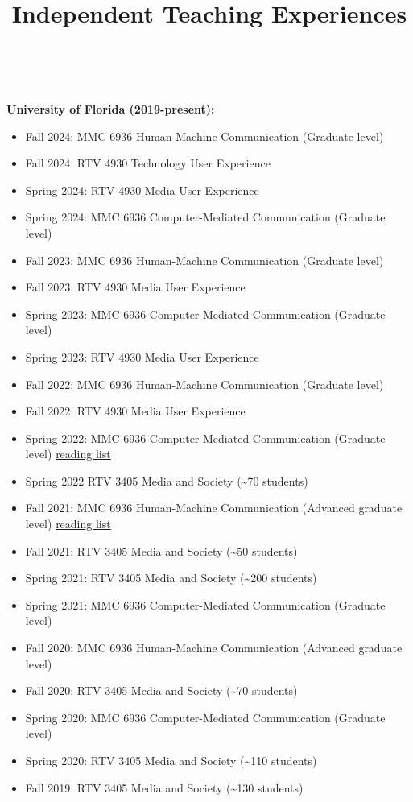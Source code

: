 \documentclass[]{article}
\title{Independent Teaching Experiences}
\author{}
\date{\vspace{-2.5em}}
\providecommand{\tightlist}{%
  \setlength{\itemsep}{0pt}\setlength{\parskip}{0pt}}
\begin{document}
\maketitle

~ ~

\textbf{University of Florida (2019-present):}

\begin{itemize}
\tightlist
\item
  Fall 2024: MMC 6936 Human-Machine Communication (Graduate level)
\item
  Fall 2024: RTV 4930 Technology User Experience
\item
  Spring 2024: RTV 4930 Media User Experience
\item
  Spring 2024: MMC 6936 Computer-Mediated Communication (Graduate level)
\item
  Fall 2023: MMC 6936 Human-Machine Communication (Graduate level)
\item
  Fall 2023: RTV 4930 Media User Experience
\item
  Spring 2023: MMC 6936 Computer-Mediated Communication (Graduate level)
\item
  Spring 2023: RTV 4930 Media User Experience
\item
  Fall 2022: MMC 6936 Human-Machine Communication (Graduate level)
\item
  Fall 2022: RTV 4930 Media User Experience
\item
  Spring 2022: MMC 6936 Computer-Mediated Communication (Graduate level)
  \href{Files/CMC\%20readings.pdf}{reading list}
\item
  Spring 2022 RTV 3405 Media and Society (\textasciitilde{}70 students)
\item
  Fall 2021: MMC 6936 Human-Machine Communication (Advanced graduate
  level) \href{Files/HMC\%20reading\%20list.pdf}{reading list}
\item
  Fall 2021: RTV 3405 Media and Society (\textasciitilde{}50 students)
\item
  Spring 2021: RTV 3405 Media and Society (\textasciitilde{}200
  students)
\item
  Spring 2021: MMC 6936 Computer-Mediated Communication (Graduate level)
\item
  Fall 2020: MMC 6936 Human-Machine Communication (Advanced graduate
  level)
\item
  Fall 2020: RTV 3405 Media and Society (\textasciitilde{}70 students)
\item
  Spring 2020: MMC 6936 Computer-Mediated Communication (Graduate level)
\item
  Spring 2020: RTV 3405 Media and Society (\textasciitilde{}110
  students)
\item
  Fall 2019: RTV 3405 Media and Society (\textasciitilde{}130 students)
\end{itemize}
\end{document}

